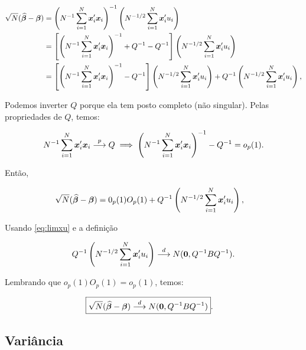 \documentclass[11pt, oneside, a4paper, article]{article}
\numberwithin{equation}{section}
\begin{document}
\vspace{-1 em}
\begin{align*}
\sqrt{N} (\widehat{\boldsymbol{\beta}} - \boldsymbol{\beta}) &=
\left( N^{-1} \sum_{i=1}^{N} \boldsymbol{x}_{i}' \boldsymbol{x}_{i} \right)^{-1}
\left( N^{-1/2} \sum_{i=1}^{N} \boldsymbol{x}_{i}' u_{i} \right)
\\ &=
\left[ 
\left( N^{-1} \sum_{i=1}^{N} \boldsymbol{x}_{i}' \boldsymbol{x}_{i} \right)^{-1} 
+ Q^{-1} - Q^{-1}
\right]
\left( N^{-1/2} \sum_{i=1}^{N} \boldsymbol{x}_{i}' u_{i} \right)
\\ &=
\left[ 
\left( N^{-1} \sum_{i=1}^{N} \boldsymbol{x}_{i}' \boldsymbol{x}_{i} \right)^{-1} 
- Q^{-1}
\right]
\left( N^{-1/2} \sum_{i=1}^{N} \boldsymbol{x}_{i}' u_{i} \right)
+ Q^{-1} 
\left( N^{-1/2} \sum_{i=1}^{N} \boldsymbol{x}_{i}' u_{i} \right),
\end{align*}

\noident
Podemos inverter $Q$ porque ela tem posto completo (não singular).
Pelas propriedades de $Q$, temos:

\vspace{-1 em}
\begin{align*}
N^{-1} \sum_{i=1}^{N} \boldsymbol{x}_{i}' \boldsymbol{x}_{i}  \overset{p}{\longrightarrow}  Q
\implies
\left( N^{-1} \sum_{i=1}^{N} \boldsymbol{x}_{i}' \boldsymbol{x}_{i} \right)^{-1}  - Q^{-1} = o_{p}(1).
\end{align*}

Então,

\vspace{-1 em}
\begin{align*}
\sqrt{N} (\widehat{\boldsymbol{\beta}} - \boldsymbol{\beta}) &=
0_{p}(1) O_{p}(1)
+ Q^{-1} \left( N^{-1/2} \sum_{i=1}^{N} \boldsymbol{x}_{i}' u_{i} \right),
\end{align*}

Usando \eqref{eq:limxu} e a definição 

\begin{align*}
Q^{-1} \left( N^{-1/2} \sum_{i=1}^{N} \boldsymbol{x}_{i}' u_{i} \right)
 \overset{d}{\longrightarrow}  
N(\boldsymbol{0}, Q^{-1} B Q^{-1}).
\end{align*}

Lembrando que $o_{p}(1) O_{p}(1) = o_{p}(1)$, temos:

\vspace{-1 em}
\begin{align*}
	\Aboxed{\sqrt{N} (\betahatbold - \betavec) \arrowd N(\mbs{0}, Q^{-1} B Q^{-1})}.
\end{align*}

\subsection{Variância}
\end{document}
